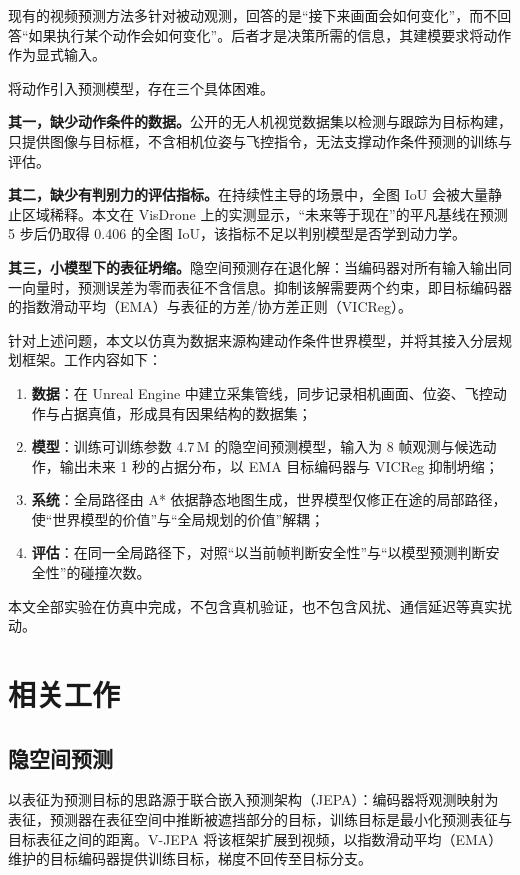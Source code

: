 \documentclass[12pt,a4paper]{ctexart}
\let\origcite\cite
\renewcommand{\cite}[2][]{\nobreak\mbox{\origcite[#1]{#2}}}
\begin{document}
现有的视频预测方法多针对被动观测，回答的是``接下来画面会如何变化''\cite{bardes2024vjepa,hafner2024dreamerv3}，而不回答``如果执行某个动作会如何变化''。后者才是决策所需的信息，其建模要求将动作作为显式输入。

将动作引入预测模型，存在三个具体困难。

\textbf{其一，缺少动作条件的数据。}公开的无人机视觉数据集以检测与跟踪为目标构建\cite{zhu2021visdrone}，只提供图像与目标框，不含相机位姿与飞控指令，无法支撑动作条件预测的训练与评估。

\textbf{其二，缺少有判别力的评估指标。}在持续性主导的场景中，全图 IoU 会被大量静止区域稀释。本文在 VisDrone 上的实测显示，``未来等于现在''的平凡基线在预测 5 步后仍取得 0.406 的全图 IoU，该指标不足以判别模型是否学到动力学。

\textbf{其三，小模型下的表征坍缩。}隐空间预测存在退化解：当编码器对所有输入输出同一向量时，预测误差为零而表征不含信息。抑制该解需要两个约束，即目标编码器的指数滑动平均（EMA）与表征的方差/协方差正则（VICReg）\cite{bardes2022vicreg}。

针对上述问题，本文以仿真为数据来源构建动作条件世界模型，并将其接入分层规划框架。工作内容如下：

\begin{enumerate}
  \item \textbf{数据}：在 Unreal Engine 中建立采集管线，同步记录相机画面、位姿、飞控动作与占据真值，形成具有因果结构的数据集；
  \item \textbf{模型}：训练可训练参数 4.7\,M 的隐空间预测模型，输入为 8 帧观测与候选动作，输出未来 1 秒的占据分布，以 EMA 目标编码器与 VICReg 抑制坍缩；
  \item \textbf{系统}：全局路径由 A* 依据静态地图生成，世界模型仅修正在途的局部路径，使``世界模型的价值''与``全局规划的价值''解耦；
  \item \textbf{评估}：在同一全局路径下，对照``以当前帧判断安全性''与``以模型预测判断安全性''的碰撞次数。
\end{enumerate}

本文全部实验在仿真中完成，不包含真机验证，也不包含风扰、通信延迟等真实扰动。

\section{相关工作}

\subsection{隐空间预测}
以表征为预测目标的思路源于联合嵌入预测架构（JEPA）\cite{assran2023ijepa}：编码器将观测映射为表征，预测器在表征空间中推断被遮挡部分的目标，训练目标是最小化预测表征与目标表征之间的距离。V-JEPA 将该框架扩展到视频\cite{bardes2024vjepa}，以指数滑动平均（EMA）维护的目标编码器提供训练目标，梯度不回传至目标分支。
\end{document}
